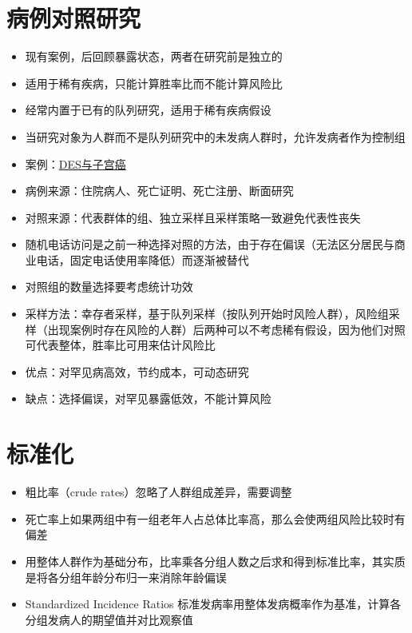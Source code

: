 \documentclass[]{book}
\providecommand{\tightlist}{%
  \setlength{\itemsep}{0pt}\setlength{\parskip}{0pt}}
\begin{document}
\section{病例对照研究}

\begin{itemize}
\tightlist
\item
  现有案例，后回顾暴露状态，两者在研究前是独立的
\item
  适用于稀有疾病，只能计算胜率比而不能计算风险比
\item
  经常内置于已有的队列研究，适用于稀有疾病假设
\item
  当研究对象为人群而不是队列研究中的未发病人群时，允许发病者作为控制组
\item
  案例：\href{http://www.cancer.gov/about-cancer/causes-prevention/risk/hormones/des-fact-sheet}{DES与子宫癌}
\item
  病例来源：住院病人、死亡证明、死亡注册、断面研究
\item
  对照来源：代表群体的组、独立采样且采样策略一致避免代表性丧失
\item
  随机电话访问是之前一种选择对照的方法，由于存在偏误（无法区分居民与商业电话，固定电话使用率降低）而逐渐被替代
\item
  对照组的数量选择要考虑统计功效
\item
  采样方法：幸存者采样，基于队列采样（按队列开始时风险人群），风险组采样（出现案例时存在风险的人群）后两种可以不考虑稀有假设，因为他们对照可代表整体，胜率比可用来估计风险比
\item
  优点：对罕见病高效，节约成本，可动态研究
\item
  缺点：选择偏误，对罕见暴露低效，不能计算风险
\end{itemize}

\section{标准化}

\begin{itemize}
\tightlist
\item
  粗比率（crude rates）忽略了人群组成差异，需要调整
\item
  死亡率上如果两组中有一组老年人占总体比率高，那么会使两组风险比较时有偏差
\item
  用整体人群作为基础分布，比率乘各分组人数之后求和得到标准比率，其实质是将各分组年龄分布归一来消除年龄偏误
\item
  Standardized Incidence Ratios 标准发病率用整体发病概率作为基准，计算各分组发病人的期望值并对比观察值
\end{itemize}
\end{document}
